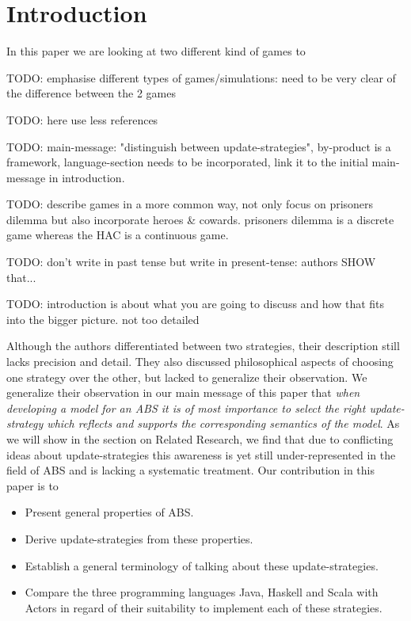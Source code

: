 \section{Introduction}
In this paper we are looking at two different kind of games to 

TODO: emphasise different types of games/simulations: need to be very clear of the difference between the 2 games

TODO: here use less references

TODO: main-message: "distinguish between update-strategies", by-product is a framework, language-section needs to be incorporated, link it to the initial main-message in introduction.

TODO: describe games in a more common way, not only focus on prisoners dilemma but also incorporate heroes \& cowards. prisoners dilemma is a discrete game whereas the HAC is a continuous game.

TODO: don't write in past tense but write in present-tense: authors SHOW that...

TODO: introduction is about what you are going to discuss and how that fits into the bigger picture. not too detailed


Although the authors differentiated between two strategies, their description still lacks precision and detail. They also discussed philosophical aspects of choosing one strategy over the other, but lacked to generalize their observation. We generalize their observation in our main message of this paper that \textit{when developing a model for an ABS it is of most importance to select the right update-strategy which reflects and supports the corresponding semantics of the model}. As we will show in the section on Related Research, we find that due to conflicting ideas about update-strategies this awareness is yet still under-represented in the field of ABS and is lacking a systematic treatment. Our contribution in this paper is to
\begin{itemize}
	\item Present general properties of ABS.
	\item Derive update-strategies from these properties.
	\item Establish a general terminology of talking about these update-strategies.
	\item Compare the three programming languages Java, Haskell and Scala with Actors in regard of their suitability to implement each of these strategies.
\end{itemize}

